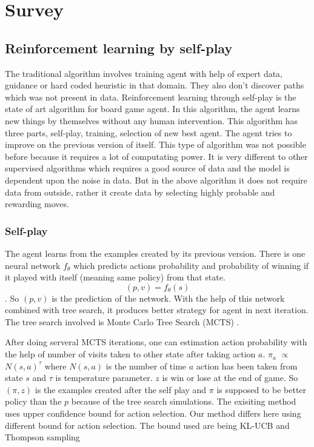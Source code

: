 \chapter{Survey}

\section{Reinforcement learning by self-play}
The traditional algorithm involves training agent with help of expert data, guidance or hard coded heuristic in that domain. They also don't discover paths which was not present in data. Reinforcement learning through self-play \cite{alphagozero} is the state of art algorithm for board game agent. In this algorithm, the agent learns new things by themselves without any human intervention. This algorithm has three parts, self-play, training, selection of new best agent. The agent tries to improve on the previous version of itself. This type of algorithm was not possible before because it requires a lot of computating power. It is very different to other supervised algorithms which requires a good source of data and the model is dependent upon the noise in data. But in the above algorithm it does not require data from outside, rather it create data by selecting highly probable and rewarding moves.


\subsection{Self-play}
The agent learns from the examples created by its previous version. There is one neural network $f_{\theta}$ which predicts actions probability and probability of winning if it played with itself (meaning same policy) from that state. $$ (p,v) = f_{\theta}(s) $$. So $(p,v)$ is the prediction of the network. With the help of this network combined with tree search, it produces better strategy for agent in next iteration. The tree search involved is Monte Carlo Tree Search (MCTS) \cite{alphagozero}.


After doing serveral MCTS iterations, one can estimation action probability with the help of number of visits taken to other state after taking action $a$.
$ \pi_{a} $ $ \propto $ $N(s,a)^{\tau}$ where $N(s,a)$ is the number of time $a$ action has been taken from state $s$ and $\tau$ is temperature parameter. $z$ is win or lose at the end of game. So $(\pi,z)$ is the examples created after the self play and $\pi$ is supposed to be better policy than the $p$ because of the tree search simulations.
The exisiting method uses upper confidence bound for action selection. Our method differs here using different bound for action selection. The bound used are being KL-UCB \cite{klucb} and Thompson sampling \cite{thompson}
